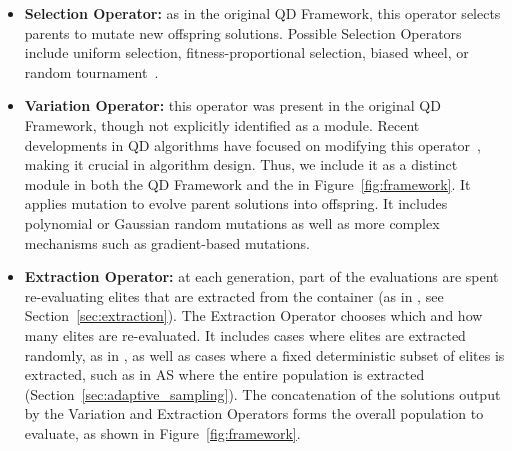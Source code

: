 \begin{itemize}
    \item \textbf{Selection Operator:} as in the original QD Framework, this operator selects parents to mutate new offspring solutions. Possible Selection Operators include uniform selection, fitness-proportional selection, biased wheel, or random tournament~\cite{framework}. 

    \item \textbf{Variation Operator:} this operator was present in the original QD Framework, though not explicitly identified as a module. Recent developments in QD algorithms have focused on modifying this operator~\cite{tjanaka2022approximating, pierrot2022diversity, nilsson2021policy, faldor2023synergizing, flageat2024enhancing}, making it crucial in algorithm design. Thus, we include it as a distinct module in both the QD Framework and the \framework{} in Figure~\ref{fig:framework}. It applies mutation to evolve parent solutions into offspring. It includes polynomial or Gaussian random mutations as well as more complex mechanisms such as gradient-based mutations. 

    \item \textbf{Extraction Operator:} at each generation, part of the evaluations are spent re-evaluating elites that are extracted from the container (as in \name{}, see Section~\ref{sec:extraction}). The Extraction Operator chooses which and how many elites are re-evaluated. 
    It includes cases where elites are extracted randomly, as in \name{}, as well as cases where a fixed deterministic subset of elites is extracted, such as in AS where the entire population is extracted (Section~\ref{sec:adaptive_sampling}). 
    The concatenation of the solutions output by the Variation and Extraction Operators forms the overall population to evaluate, as shown in Figure~\ref{fig:framework}. 


\end{itemize}
